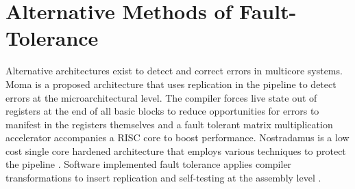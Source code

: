 \section{Alternative Methods of Fault-Tolerance}
Alternative architectures exist to detect and correct errors in multicore systems. Moma \cite{ferreira2014adaptive} is a proposed architecture that uses replication in the pipeline to detect errors at the microarchitectural level. The compiler forces live state out of registers at the end of all basic blocks to reduce opportunities for errors to manifest in the registers themselves and a fault tolerant matrix multiplication accelerator accompanies a RISC core to boost performance. Nostradamus is a low cost single core hardened architecture that employs various techniques to protect the pipeline \cite{nathan2014nostradamus}. Software implemented fault tolerance applies compiler transformations to insert replication and self-testing at the assembly level \cite{reis2005swift}.